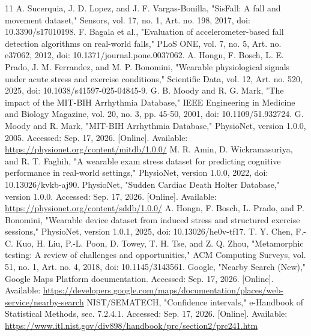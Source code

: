 \documentclass[journal]{IEEEtran}
\begin{document}
\begin{thebibliography}{11}
A. Sucerquia, J. D. Lopez, and J. F. Vargas-Bonilla, "SisFall: A fall and movement dataset," Sensors, vol. 17, no. 1, Art. no. 198, 2017, doi: 10.3390/s17010198.
F. Bagala et al., "Evaluation of accelerometer-based fall detection algorithms on real-world falls," PLoS ONE, vol. 7, no. 5, Art. no. e37062, 2012, doi: 10.1371/journal.pone.0037062.
A. Hongn, F. Bosch, L. E. Prado, J. M. Ferrandez, and M. P. Bonomini, "Wearable physiological signals under acute stress and exercise conditions," Scientific Data, vol. 12, Art. no. 520, 2025, doi: 10.1038/s41597-025-04845-9.
G. B. Moody and R. G. Mark, "The impact of the MIT-BIH Arrhythmia Database," IEEE Engineering in Medicine and Biology Magazine, vol. 20, no. 3, pp. 45-50, 2001, doi: 10.1109/51.932724.
G. Moody and R. Mark, "MIT-BIH Arrhythmia Database," PhysioNet, version 1.0.0, 2005. Accessed: Sep. 17, 2026. [Online]. Available: \url{https://physionet.org/content/mitdb/1.0.0/}
M. R. Amin, D. Wickramasuriya, and R. T. Faghih, "A wearable exam stress dataset for predicting cognitive performance in real-world settings," PhysioNet, version 1.0.0, 2022, doi: 10.13026/kvkb-aj90.
PhysioNet, "Sudden Cardiac Death Holter Database," version 1.0.0. Accessed: Sep. 17, 2026. [Online]. Available: \url{https://physionet.org/content/sddb/1.0.0/}
A. Hongn, F. Bosch, L. Prado, and P. Bonomini, "Wearable device dataset from induced stress and structured exercise sessions," PhysioNet, version 1.0.1, 2025, doi: 10.13026/he0v-tf17.
T. Y. Chen, F.-C. Kuo, H. Liu, P.-L. Poon, D. Towey, T. H. Tse, and Z. Q. Zhou, "Metamorphic testing: A review of challenges and opportunities," ACM Computing Surveys, vol. 51, no. 1, Art. no. 4, 2018, doi: 10.1145/3143561.
Google, "Nearby Search (New)," Google Maps Platform documentation. Accessed: Sep. 17, 2026. [Online]. Available: \url{https://developers.google.com/maps/documentation/places/web-service/nearby-search}
NIST/SEMATECH, "Confidence intervals," e-Handbook of Statistical Methods, sec. 7.2.4.1. Accessed: Sep. 17, 2026. [Online]. Available: \url{https://www.itl.nist.gov/div898/handbook/prc/section2/prc241.htm}
\end{thebibliography}
\end{document}
